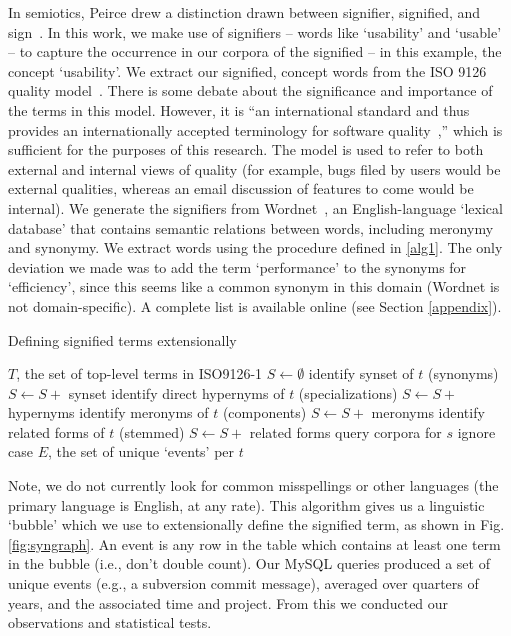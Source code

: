 \documentclass[conference, compsoc]{IEEEtran}
\begin{document}
In semiotics, Peirce drew a distinction drawn between signifier, signified, and sign~\cite{atkin2006}. In this work, we make use of signifiers -- words like `usability' and `usable' -- to capture the occurrence in our corpora of the signified -- in this example, the concept `usability'. We extract our signified, concept words from the ISO 9126 quality model~\cite{iso9126}. There is some debate about the significance and importance of the terms in this model. However, it is ``an international standard and thus provides an internationally accepted terminology for software quality~\cite[p. 58]{Boegh2008},'' which is sufficient for the purposes of this research. The model is used to refer to both external and internal views of quality (for example, bugs filed by users would be external qualities, whereas an email discussion of features to come would be internal). We generate the signifiers from Wordnet~\cite{Fellbaum1998}, an English-language `lexical database' that contains semantic relations between words, including meronymy and synonymy. We extract words using the procedure defined in \ref{alg1}. The only deviation we made was to add the term `performance' to the synonyms for `efficiency', since this seems like a common synonym in this domain (Wordnet is not domain-specific). A complete list is available online (see Section \ref{appendix}). %

\renewcommand{\algorithmiccomment}[1]{// #1}
\begin{algorithm}[H]
\caption{Defining signified terms extensionally}
  \label{alg1}
\begin{algorithmic}
	\REQUIRE $T$, the set of top-level terms in ISO9126-1
	\STATE $S \leftarrow \emptyset $
	\STATE identify synset of $t$ (synonyms)%
	\STATE $S \leftarrow S +$ synset
	\STATE identify direct hypernyms of $t$ (specializations)%
	\STATE $S \leftarrow S +$ hypernyms %
	\STATE identify meronyms of $t$ (components)%
	\STATE $S \leftarrow S +$ meronyms %
	\STATE identify related forms of $t$ (stemmed)%
	\STATE $S \leftarrow S +$ related forms
		\STATE query corpora for $s$
		\COMMENT ignore case
	\ENDFOR
  \ENDFOR
\RETURN $E$, the set of unique `events' per $t$

\end{algorithmic}
\end{algorithm}
Note, we do not currently look for common misspellings or other languages (the primary language is English, at any rate). This algorithm gives us a linguistic `bubble' which we use to extensionally define the signified term, as shown in Fig. \ref{fig:syngraph}. An event is any row in the table which contains at least one term in the bubble (i.e., don't double count). Our MySQL queries produced a set of unique events (e.g., a subversion commit message), averaged over quarters of years, and the associated time and project. From this we conducted our observations and statistical tests.
\end{document}
